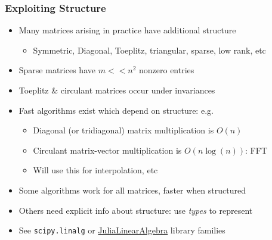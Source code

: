 \documentclass[bigger]{beamer}
\begin{document}
\begin{frame}%
\frametitle{Exploiting Structure}

\begin{itemize}

\item Many matrices arising in practice have additional structure

\begin{itemize}
\item Symmetric, Diagonal, Toeplitz, triangular, sparse, low rank, etc
\end{itemize}

\item Sparse matrices have $m<<n^2$ nonzero entries
\item Toeplitz \& circulant matrices occur under invariances
\item Fast algorithms exist which depend on structure: e.g.
  \begin{itemize}
  \item Diagonal (or tridiagonal) matrix multiplication is $O(n)$
  \item Circulant matrix-vector multiplication is $O(n\log (n))$: FFT
  \item Will use this for interpolation, etc
  \end{itemize}
\item Some algorithms work for all matrices, faster when structured
\item Others need explicit info about structure: use \emph{types} to represent
\item See \texttt{scipy.linalg} or \href{https://github.com/JuliaLinearAlgebra}{JuliaLinearAlgebra} library families

\end{itemize}

\end{frame}
\end{document}

